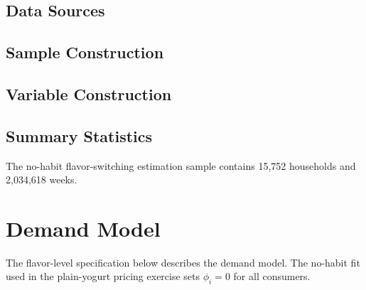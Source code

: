 \documentclass[12pt]{article}
\theoremstyle{definition}
\theoremstyle{remark}
\begin{document}
\subsection{Data Sources}



\subsection{Sample Construction}

\subsection{Variable Construction}

\subsection{Summary Statistics}
The no-habit flavor-switching estimation sample contains 15,752 households and 2,034,618 weeks.

%
%


\section{Demand Model}
\label{sec:demand-model}
The flavor-level specification below describes the demand model. The no-habit fit used in the plain-yogurt pricing exercise sets $\phi_i=0$ for all consumers.
\end{document}
